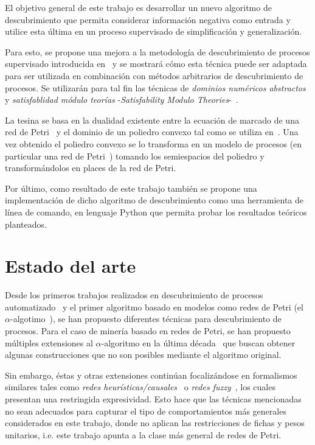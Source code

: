 El objetivo general de este trabajo es desarrollar un nuevo algoritmo de descubrimiento que permita considerar
información negativa como entrada y utilice esta última en un proceso supervisado de simplificación y 
generalización. 

Para esto, se propone una mejora a la metodología de descubrimiento de procesos supervisado introducida en~\cite{LeonCB15}
y se mostrará cómo esta técnica puede ser adaptada para ser utilizada en combinación con métodos arbitrarios
de descubrimiento de procesos. Se utilizarán para tal fin las técnicas de
\textit{dominios numéricos abstractos}~\cite{Rockafellar70} y \textit{satisfablidad módulo teorías}
-\textit{Satisfability Modulo Theories}-~\cite{NieuwenhuisOT06}.

La tesina se basa en la dualidad existente entre la ecuación de marcado de una red de Petri~\cite{SilvaTC96}
y el dominio de un poliedro convexo tal como se utiliza en~\cite{CarmonaC14}.
Una vez obtenido el poliedro convexo se lo transforma en un modelo de
procesos (en particular una red de Petri~\cite{Murata89}) tomando los semiespacios del poliedro y
transformándolos en places de la red de Petri.

Por último, como resultado de este trabajo también se propone una implementación de dicho algoritmo de descubrimiento como una 
herramienta de línea de comando, en lenguaje Python que permita probar los resultados
teóricos planteados.

\section{Estado del arte}
\label{sec:esatdo_del_arte}

Desde los primeros trabajos realizados en descubrimiento de procesos automatizado~\cite{CookW98, AgrawalGL98} y el primer
algoritmo basado en modelos como redes de Petri (el $\alpha$-algotimo~\cite{AalstWM04}), se han propuesto diferentes
técnicas para descubrimiento de procesos. 
Para el caso de minería basado en redes de Petri, se han propuesto múltiples extensiones al
$\alpha$-algoritmo en la última década~\cite{MedeirosAW03,WenAWS07,GuoWWYY15} que buscan obtener algunas
construcciones que no son posibles mediante el algoritmo original.


Sin embargo, éstas y otras extensiones continúan focalizándose en formalismos similares tales como
\emph{redes heurísticas/causales}~\cite{WeijtersR11} o \emph{redes fuzzy}~\cite{AalstG07}, los cuales presentan
una restringida expresividad.
Esto hace que las técnicas mencionadas no sean adecuados para capturar el tipo de comportamientos más generales
considerados en este trabajo, donde no aplican las restricciones de fichas y pesos unitarios, i.e. este trabajo
apunta a la clase más general de redes de Petri.


